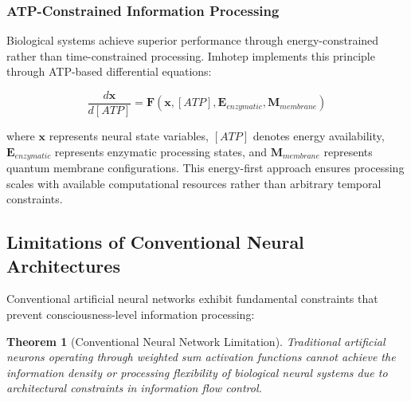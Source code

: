 \documentclass[12pt,a4paper]{article}
\newtheorem{theorem}{Theorem}[section]
\theoremstyle{remark}
\begin{document}
\subsubsection{ATP-Constrained Information Processing}

Biological systems achieve superior performance through energy-constrained rather than time-constrained processing. Imhotep implements this principle through ATP-based differential equations:

\begin{equation}
\frac{d\mathbf{x}}{d[ATP]} = \mathbf{F}(\mathbf{x}, [ATP], \mathbf{E}_{enzymatic}, \mathbf{M}_{membrane})
\end{equation}

where $\mathbf{x}$ represents neural state variables, $[ATP]$ denotes energy availability, $\mathbf{E}_{enzymatic}$ represents enzymatic processing states, and $\mathbf{M}_{membrane}$ represents quantum membrane configurations. This energy-first approach ensures processing scales with available computational resources rather than arbitrary temporal constraints.

\subsection{Limitations of Conventional Neural Architectures}

Conventional artificial neural networks exhibit fundamental constraints that prevent consciousness-level information processing:

\begin{theorem}[Conventional Neural Network Limitation]
Traditional artificial neurons operating through weighted sum activation functions cannot achieve the information density or processing flexibility of biological neural systems due to architectural constraints in information flow control.
\end{theorem}
\end{document}
